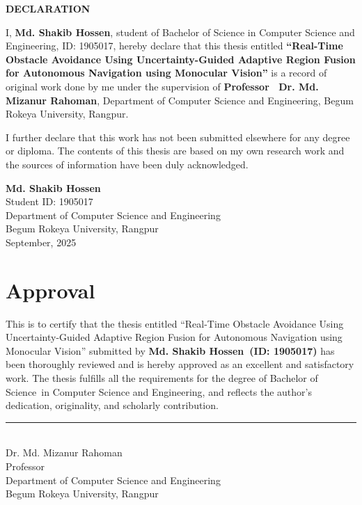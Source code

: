 \documentclass[12pt,oneside]{book}
\newcommand{\thesistitle}{Real-Time Obstacle Avoidance Using Uncertainty-Guided Adaptive Region Fusion for Autonomous Navigation using Monocular Vision}
\newcommand{\theauthor}{Md. Shakib Hossen}
\newcommand{\thedegree}{Bachelor of Science}
\newcommand{\themajor}{Computer Science and Engineering}
\newcommand{\thesupervisor}{ Dr. Md. Mizanur Rahoman}
\newcommand{\thesupervisortitle}{Professor}
\newcommand{\thedepartment}{Department of Computer Science and Engineering}
\newcommand{\theuniversity}{Begum Rokeya University, Rangpur}
\begin{document}


\thispagestyle{empty}
\vspace*{1cm}

\begin{center}
    {\Large\bfseries DECLARATION}
\end{center}

\vspace{0.8cm}

I, \textbf{\theauthor}, student of Bachelor of Science in Computer Science and Engineering, ID: 1905017, hereby declare that this thesis entitled \textbf{``\thesistitle''} is a record of original work done by me under the supervision of \textbf{\thesupervisortitle~\thesupervisor}, Department of Computer Science and Engineering, Begum Rokeya University, Rangpur.

\vspace{0.8cm}

I further declare that this work has not been submitted elsewhere for any degree or diploma. The contents of this thesis are based on my own research work and the sources of information have been duly acknowledged.

\vspace{2cm}

\begin{flushright}
    \textbf{\theauthor}\\
    Student ID: 1905017\\
    Department of Computer Science and Engineering\\
    Begum Rokeya University, Rangpur\\
    September, 2025
\end{flushright}

\clearpage
\chapter*{Approval}
\thispagestyle{empty}
This is to certify that the thesis entitled ``\thesistitle'' submitted by \textbf{ \theauthor\  (ID: 1905017)} has been thoroughly reviewed and is hereby approved as an excellent and satisfactory work. The thesis fulfills all the requirements for the degree of \thedegree\ in \themajor, and reflects the author’s dedication, originality, and scholarly contribution.

\vspace{3cm}
\noindent
\rule{7cm}{0.5pt}\\
\thesupervisor\\
\thesupervisortitle\\
\thedepartment\\
\theuniversity
\end{document}
